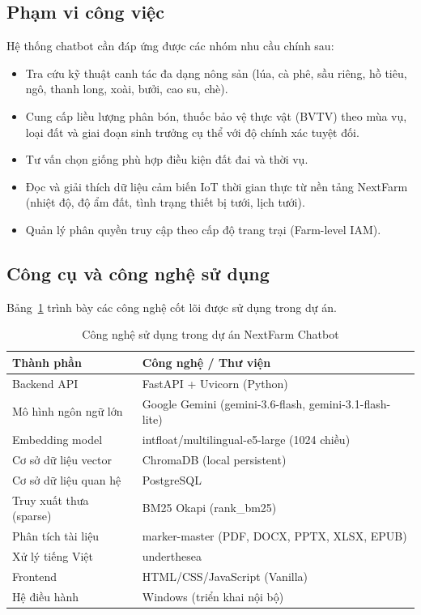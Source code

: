 \subsection{Phạm vi công việc}

Hệ thống chatbot cần đáp ứng được các nhóm nhu cầu chính sau:

\begin{itemize}
    \item Tra cứu kỹ thuật canh tác đa dạng nông sản (lúa, cà phê, sầu riêng, hồ tiêu, ngô, thanh long, xoài, bưởi, cao su, chè).
    \item Cung cấp liều lượng phân bón, thuốc bảo vệ thực vật (BVTV) theo mùa vụ, loại đất và giai đoạn sinh trưởng cụ thể với độ chính xác tuyệt đối.
    \item Tư vấn chọn giống phù hợp điều kiện đất đai và thời vụ.
    \item Đọc và giải thích dữ liệu cảm biến IoT thời gian thực từ nền tảng NextFarm (nhiệt độ, độ ẩm đất, tình trạng thiết bị tưới, lịch tưới).
    \item Quản lý phân quyền truy cập theo cấp độ trang trại (Farm-level IAM).
\end{itemize}

\subsection{Công cụ và công nghệ sử dụng}

Bảng~\ref{tab:cong-nghe} trình bày các công nghệ cốt lõi được sử dụng trong dự án.

\begin{table}[H]
\caption{Công nghệ sử dụng trong dự án NextFarm Chatbot}
\label{tab:cong-nghe}
\centering
\begin{tabular}{|p{4.5cm}|p{9cm}|}
\hline
\textbf{Thành phần} & \textbf{Công nghệ / Thư viện} \\
\hline
Backend API & FastAPI + Uvicorn (Python) \\
\hline
Mô hình ngôn ngữ lớn & Google Gemini (gemini-3.6-flash, gemini-3.1-flash-lite) \\
\hline
Embedding model & intfloat/multilingual-e5-large (1024 chiều) \\
\hline
Cơ sở dữ liệu vector & ChromaDB (local persistent) \\
\hline
Cơ sở dữ liệu quan hệ & PostgreSQL \\
\hline
Truy xuất thưa (sparse) & BM25 Okapi (rank\_bm25) \\
\hline
Phân tích tài liệu & marker-master (PDF, DOCX, PPTX, XLSX, EPUB) \\
\hline
Xử lý tiếng Việt & underthesea \\
\hline
Frontend & HTML/CSS/JavaScript (Vanilla) \\
\hline
Hệ điều hành & Windows (triển khai nội bộ) \\
\hline
\end{tabular}
\end{table}

